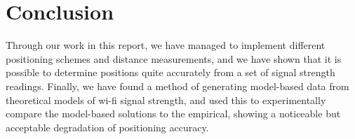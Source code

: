 \section{Conclusion}

Through our work in this report, we have managed to implement different positioning schemes and distance measurements, and we have shown that it is possible to determine positions quite accurately from a set of signal strength readings.
Finally, we have found a method of generating model-based data from theoretical models of wi-fi signal strength, and used this to experimentally compare the model-based solutions to the empirical, showing a noticeable but acceptable degradation of positioning accuracy.